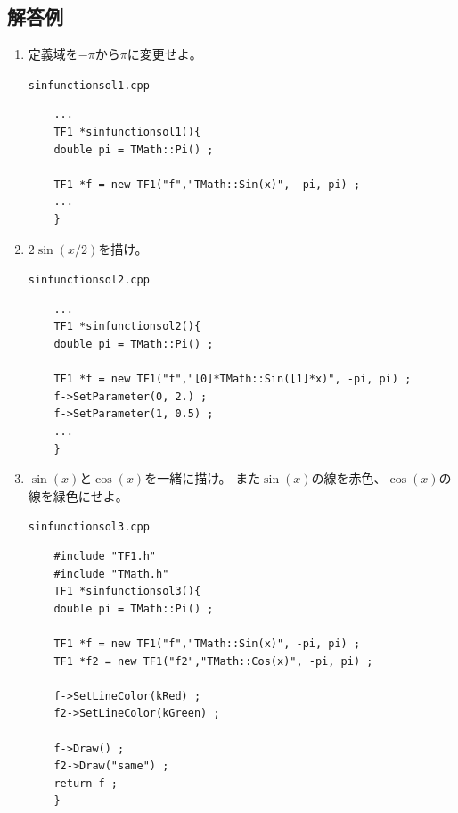   \subsection{解答例}
  \begin{enumerate}
   \item 定義域を$ -\pi $から$ \pi $に変更せよ。
	 \begin{itembox}{\texttt{sinfunctionsol1.cpp}}
\begin{verbatim}
	...
	TF1 *sinfunctionsol1(){
	double pi = TMath::Pi() ;

	TF1 *f = new TF1("f","TMath::Sin(x)", -pi, pi) ;
	...
	}
\end{verbatim}
	 \end{itembox}

   \item $2\sin(x/2)$を描け。
	 \begin{itembox}{\texttt{sinfunctionsol2.cpp}}
\begin{verbatim}
	...
	TF1 *sinfunctionsol2(){
	double pi = TMath::Pi() ;

	TF1 *f = new TF1("f","[0]*TMath::Sin([1]*x)", -pi, pi) ;
	f->SetParameter(0, 2.) ;
	f->SetParameter(1, 0.5) ;
	...
	}
\end{verbatim}
	 \end{itembox}

   \item $\sin(x)$と$\cos(x)$を一緒に描け。
	 また$\sin(x)$の線を赤色、$\cos(x)$の線を緑色にせよ。
	 \begin{itembox}{\texttt{sinfunctionsol3.cpp}}
\begin{verbatim}
	#include "TF1.h"
	#include "TMath.h"
	TF1 *sinfunctionsol3(){
	double pi = TMath::Pi() ;

	TF1 *f = new TF1("f","TMath::Sin(x)", -pi, pi) ;
	TF1 *f2 = new TF1("f2","TMath::Cos(x)", -pi, pi) ;

	f->SetLineColor(kRed) ;
	f2->SetLineColor(kGreen) ;

	f->Draw() ;
	f2->Draw("same") ;
	return f ;
	}
\end{verbatim}
	 \end{itembox}

  \end{enumerate}
